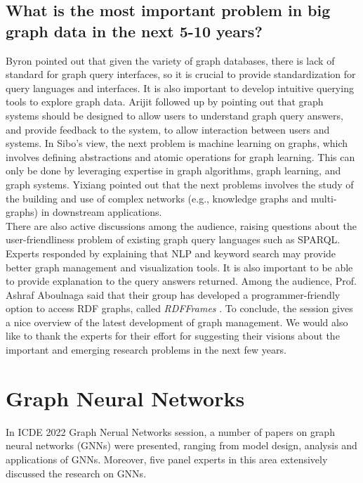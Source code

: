 \documentclass[11pt,dvipdfm]{article}
\begin{document}
\subsection{What is the most important problem in big graph data in the next 5-10 years?}

Byron pointed out that given the variety of graph databases, there is lack of standard for graph query interfaces, so it is crucial to provide standardization for query languages and interfaces. It is also important to develop intuitive querying tools to explore graph data. Arijit followed up by pointing out that graph systems should be designed to allow users to understand graph query answers, and provide feedback to the system, to allow interaction between users and systems.  In Sibo's view, the next problem is machine learning on graphs, which involves defining abstractions and atomic operations for graph learning. This can only be done by leveraging expertise in graph algorithms, graph learning, and graph systems. Yixiang pointed out that the next problems involves the study of the building and use of complex networks (e.g., knowledge graphs and multi-graphs) in downstream applications.\\


\noindent
There are also active discussions among the audience, raising questions about the user-friendliness problem of existing graph query languages such as SPARQL. Experts responded by explaining that NLP and keyword search may provide better graph management and visualization tools. It is also important to be able to provide explanation to the query answers returned.  Among the audience, Prof. Ashraf Aboulnaga said that their group has developed a programmer-friendly option to access RDF graphs, called {\it RDFFrames} \cite{MohamedAGKA22}.  To conclude, the session gives a nice overview of the latest development of graph management. We would also like to thank the experts for their effort for suggesting their  visions about the important and emerging research problems in the next few years.


\section{Graph Neural Networks}

In ICDE 2022 Graph Nerual Networks session, a number of papers on graph neural networks (GNNs) were presented, ranging from model design, analysis and applications of GNNs. Moreover, five panel experts in this area extensively discussed the research on GNNs.
\end{document}
